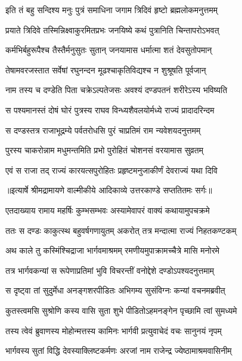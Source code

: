 \twolineshloka
{इति तं बहु सन्दिश्य मनुः पुत्रं समाधिना}
{जगाम त्रिदिवं हृष्टो ब्रह्मलोकमनुत्तमम्} %

\twolineshloka
{प्रयाते त्रिदिवे तस्मिन्निक्ष्वाकुरमितप्रभः}
{जनयिष्ये कथं पुत्रानिति चिन्तापरोऽभवत्} %

\twolineshloka
{कर्मभिर्बहुरूपैश्च तैस्तैर्मनुसुतः सुतान्}
{जनयामास धर्मात्मा शतं देवसुतोपमान्} %

\twolineshloka
{तेषामवरजस्तात सर्वेषां रघुनन्दन}
{मूढश्चाकृतिविद्यश्च न शुश्रूषति पूर्वजान्} %

\twolineshloka
{नाम तस्य च दण्डेति पिता चक्रेऽल्पतेजसः}
{अवश्यं दण्डपतनं शरीरेऽस्य भविष्यति} %

\twolineshloka
{स पश्यमानस्तं दोषं घोरं पुत्रस्य राघव}
{विन्ध्यशैवलयोर्मध्ये राज्यं प्रादादरिन्दम} %

\twolineshloka
{स दण्डस्तत्र राजाभूद्रम्ये पर्वतरोधसि}
{पुरं चाप्रतिमं राम न्यवेशयदनुत्तमम्} %

\twolineshloka
{पुरस्य चाकरोन्नाम मधुमन्तमिति प्रभो}
{पुरोहितं चोशनसं वरयामास सुव्रतम्} %

\twolineshloka
{एवं स राजा तद् राज्यं कारयत्सपुरोहितः}
{प्रहृष्टमनुजाकीर्णं देवराज्यं यथा दिवि} %


{॥इत्यार्षे श्रीमद्रामायणे वाल्मीकीये आदिकाव्ये उत्तरकाण्डे सप्ततितमः सर्गः॥}


\twolineshloka
{एतदाख्याय रामाय महर्षिः कुम्भसम्भवः}
{अस्यामेवापरं वाक्यं कथायामुपचक्रमे} %

\twolineshloka
{ततः स दण्डः काकुत्स्थ बहुवर्षगणायुतम्}
{अकरोत् तत्र मन्दात्मा राज्यं निहतकण्टकम्} %

\twolineshloka
{अथ काले तु कस्मिंश्चिद्राजा भार्गवमाश्रमम्}
{रमणीयमुपाक्रामच्चैत्रे मासि मनोरमे} %

\twolineshloka
{तत्र भार्गवकन्यां स रूपेणाप्रतिमां भुवि}
{विचरन्तीं वनोद्देशे दण्डोऽपश्यदनुत्तमाम्} %

\twolineshloka
{स दृष्ट्वा तां सुदुर्मेधा अनङ्गशरपीडितः}
{अभिगम्य सुसंविग्नः कन्यां वचनमब्रवीत्} %

\twolineshloka
{कुतस्त्वमसि सुश्रोणि कस्य वासि सुता शुभे}
{पीडितोऽहमनङ्गेन पृच्छामि त्वां सुमध्यमे} %

\twolineshloka
{तस्य त्वेवं ब्रुवाणस्य मोहोन्मत्तस्य कामिनः}
{भार्गवी प्रत्युवाचेदं वचः सानुनयं नृपम्} %

\twolineshloka
{भार्गवस्य सुतां विद्धि देवस्याक्लिष्टकर्मणः}
{अरजां नाम राजेन्द्र ज्येष्ठामाश्रमवासिनीम्} %

